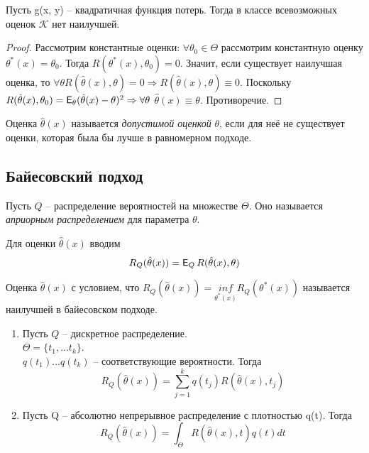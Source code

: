 \begin{example}
Пусть g(x, y) -- квадратичная функция потерь. Тогда в классе всевозможных оценок $\mathcal{K}$ нет наилучшей.
\end{example}
\begin{proof}
Рассмотрим константные оценки: $\forall \theta_0 \in \Theta$ рассмотрим константную оценку  $\theta^{*}(x) = \theta_0$. Тогда $R(\theta^{*}(x), \theta_0) = 0$. Значит, если существует наилучшая оценка, то $\forall \theta R(\hat{\theta}(x), \theta) = 0 \Rightarrow R(\hat{\theta}(x), \theta) \equiv 0$. Поскольку $R(\hat{\theta}(x), \theta_0) = \E_{\theta}(\hat{\theta}(x) - \theta)^2 \Rightarrow \forall \theta$ $\hat{\theta}(x) \equiv \theta.$ Противоречие.
\end{proof}

\begin{definition}
Оценка $\hat{\theta}(x)$ называется \emph{допустимой оценкой} $\theta$, если для неё не существует оценки, которая была бы лучше в равномерном подходе.
\end{definition}

\subsection{Байесовский подход}
\begin{definition}
Пусть $Q$ -- распределение вероятностей на множестве $\Theta$. Оно называется \emph{априорным распределением} для параметра $\theta$.  
\end{definition}
Для оценки $\hat{\theta}(x)$ вводим
$$
R_{Q}(\hat{\theta}(x)) = \E_{Q}R(\hat{\theta}(x), \theta)
$$

\begin{definition}
Оценка $\hat{\theta}(x)$ с условием, что $R_{Q}(\hat{\theta}(x)) = \underset{\theta^{*}(x)}{inf}R_{Q}(\theta^{*}(x))$  называется наилучшей в байесовском подходе.
\end{definition}

\begin{example}
\begin{enumerate}
    \item Пусть $Q$ -- дискретное распределение.\\
    $\Theta = \{t_1, \ldots t_k \}$.\\
    $q(t_1) \ldots q(t_k)$ -- соответствующие вероятности. Тогда
    $$
    R_{Q}(\hat{\theta}(x)) = \sum_{j = 1}^{k}q(t_j)R(\hat{\theta}(x), t_j)
    $$
    \item Пусть Q -- абсолютно непрерывное распределение с плотностью q(t). Тогда
    $$
    R_{Q}(\hat{\theta}(x)) = \int_{\Theta}R(\hat{\theta}(x), t) q(t)dt
    $$
\end{enumerate}
\end{example}

